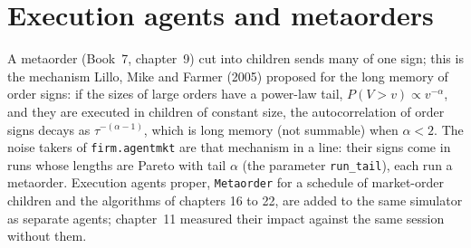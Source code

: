 \begin{omfigure}

\label{fig:mx:build-an-agent-based-market:inv}
\end{omfigure}

\section{Execution agents and metaorders}

A metaorder (Book~7, chapter~9) cut into children sends many  of one sign; this is the mechanism Lillo, Mike and Farmer (2005) proposed for
the long memory of order signs: if the sizes of large orders have a power-law tail, $P(V > v) \propto v^{-\alpha}$, and they are executed in children of
constant size, the autocorrelation of order signs decays as $\tau^{-(\alpha - 1)}$, which is long memory (not summable) when $\alpha < 2$. The noise
takers of \texttt{firm.agentmkt} are that mechanism in a line: their signs come in runs whose lengths are Pareto with tail $\alpha$ (the parameter
\texttt{run\_tail}), each run a metaorder. Execution agents proper, \texttt{Metaorder} for a schedule of market-order children and the algorithms of
chapters 16 to 22, are added to the same simulator as separate agents; chapter~11 measured their impact against the same session without them.

